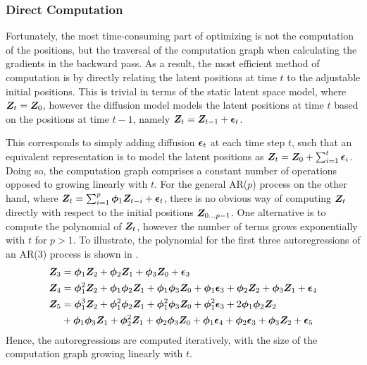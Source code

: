     \subsubsection{Direct Computation}
    
        Fortunately, the most time-consuming part of optimizing is not the computation of the positions, but the traversal of the computation graph when calculating the gradients in the backward pass. As a result, the most efficient method of computation is by directly relating the latent positions at time $t$ to the adjustable initial positions. 
        This is trivial in terms of the static latent space model, where $\bm{Z}_t=\bm{Z}_0$, however the diffusion model models the latent positions at time $t$ based on the positions at time $t-1$, namely $\bm{Z}_t=\bm{Z}_{t-1}+\bm{\epsilon}_t$.
        
        This corresponds to simply adding diffusion $\bm{\epsilon}_t$ at each time step $t$, such that an equivalent representation is to model the latent positions as $\bm{Z}_t=\bm{Z}_0+\sum_{i=1}^t\bm{\epsilon}_i$. Doing so, the computation graph comprises a constant number of operations opposed to growing linearly with $t$.
        For the general AR($p$) process on the other hand, where $\bm{Z}_t=\sum_{i=1}^p \bm{\phi}_1 \bm{Z}_{t-i} + \bm{\epsilon}_t$, there is no obvious way of computing $\bm{Z}_t$ directly with respect to the initial positions $\bm{Z}_{0\dots p-1}$. One alternative is to compute the polynomial of $\bm{Z}_t$, however the number of terms grows exponentially with $t$ for $p>1$. To illustrate, the polynomial for the first three autoregressions of an AR(3) process is shown in .
        \begin{equation}\label{eq:pyimpl-ar-polynomial}
        \begin{split}
            \bm{Z}_3 &= \bm{\phi}_1\bm{Z}_2 + \bm{\phi}_2\bm{Z}_1 + \bm{\phi}_3\bm{Z}_0 + \bm{\epsilon}_3 \\
            \bm{Z}_4 &= \bm{\phi}_1^2\bm{Z}_2 + \bm{\phi}_1\bm{\phi}_2\bm{Z}_1 + \bm{\phi}_1\bm{\phi}_3\bm{Z}_0 + \bm{\phi}_1\bm{\epsilon}_3 + \bm{\phi}_2\bm{Z}_2 + \bm{\phi}_3\bm{Z}_1 + \bm{\epsilon}_4 \\
            \bm{Z}_5 &= \bm{\phi}_1^3\bm{Z}_2 + \bm{\phi}_1^2\bm{\phi}_2\bm{Z}_1 + \bm{\phi}_1^2\bm{\phi}_3\bm{Z}_0 + \bm{\phi}_1^2\bm{\epsilon}_3 + 2\bm{\phi}_1\bm{\phi}_2\bm{Z}_2 \\
                &+ \bm{\phi}_1\bm{\phi}_3\bm{Z}_1 + \bm{\phi}_2^2\bm{Z}_1 + \bm{\phi}_2\bm{\phi}_3\bm{Z}_0 + \bm{\phi}_1\bm{\epsilon}_4 + \bm{\phi}_2\bm{\epsilon}_3 + \bm{\phi}_3\bm{Z}_2 + \bm{\epsilon}_5
        \end{split}
        \end{equation}
        Hence, the autoregressions are computed iteratively, with the size of the computation graph growing linearly with $t$.
        
